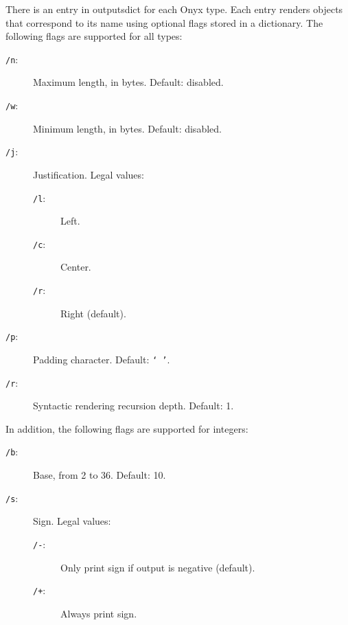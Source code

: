 There is an entry in outputsdict for each Onyx type.  Each entry renders objects
that correspond to its name using optional flags stored in a dictionary.  The
following flags are supported for all types:
\begin{description}
\item[{\tt /n}: ]
	Maximum length, in bytes.  Default: disabled.
\item[{\tt /w}: ]
	Minimum length, in bytes.  Default: disabled.
\item[{\tt /j}: ]
	Justification.  Legal values:
	\begin{description}
	\item[{\tt /l}: ]
		Left.
	\item[{\tt /c}: ]
		Center.
	\item[{\tt /r}: ]
		Right (default).
	\end{description}
\item[{\tt /p}: ]
	Padding character.  Default: {\tt ` '}.
\item[{\tt /r}: ]
	Syntactic rendering recursion depth.  Default: 1.
\end{description}

In addition, the following flags are supported for integers:
\begin{description}
\item[{\tt /b}: ]
	Base, from 2 to 36.  Default: 10.
\item[{\tt /s}: ]
	Sign.  Legal values:
	\begin{description}
	\item[{\tt /-}: ]
		Only print sign if output is negative (default).
	\item[{\tt /+}: ]
		Always print sign.
	\end{description}
\end{description}

